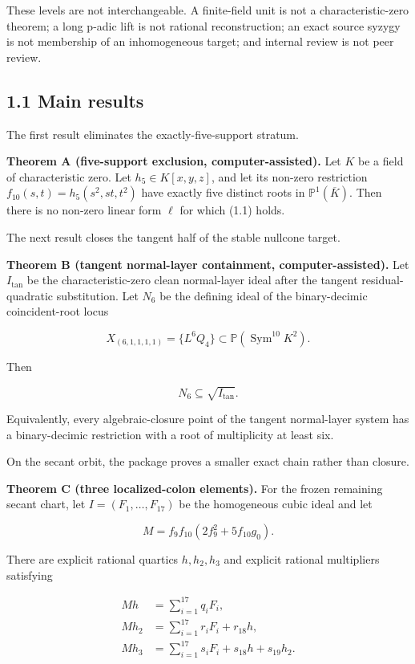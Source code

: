\documentclass[
  11pt,
]{article}
\begin{document}
These levels are not interchangeable. A finite-field unit is not a
characteristic-zero theorem; a long p-adic lift is not rational
reconstruction; an exact source syzygy is not membership of an
inhomogeneous target; and internal review is not peer review.

\subsection{1.1 Main results}\label{main-results}

The first result eliminates the exactly-five-support stratum.

\textbf{Theorem A (five-support exclusion, computer-assisted).} Let
\(K\) be a field of characteristic zero. Let \(h_5\in K[x,y,z]\), and
let its non-zero restriction \(f_{10}(s,t)=h_5(s^2,st,t^2)\) have
exactly five distinct roots in \(\mathbb P^1(\overline K)\). Then there
is no non-zero linear form \(\ell\) for which (1.1) holds.

The next result closes the tangent half of the stable nullcone target.

\textbf{Theorem B (tangent normal-layer containment,
computer-assisted).} Let \(I_{\mathrm{tan}}\) be the characteristic-zero
clean normal-layer ideal after the tangent residual-quadratic
substitution. Let \(N_6\) be the defining ideal of the binary-decimic
coincident-root locus

\[
X_{(6,1,1,1,1)}=\{L^6Q_4\}\subset
\mathbb P(\operatorname{Sym}^{10}K^2).
\]

Then

\[
N_6\subseteq \sqrt{I_{\mathrm{tan}}}.
\tag{1.2}
\]

Equivalently, every algebraic-closure point of the tangent normal-layer
system has a binary-decimic restriction with a root of multiplicity at
least six.

On the secant orbit, the package proves a smaller exact chain rather
than closure.

\textbf{Theorem C (three localized-colon elements).} For the frozen
remaining secant chart, let \(I=(F_1,\ldots,F_{17})\) be the homogeneous
cubic ideal and let

\[
M=f_9f_{10}(2f_9^2+5f_{10}g_0).
\]

There are explicit rational quartics \(h,h_2,h_3\) and explicit rational
multipliers satisfying

\[
\begin{aligned}
Mh   &=\sum_{i=1}^{17}q_iF_i,\\
Mh_2 &=\sum_{i=1}^{17}r_iF_i+r_{18}h,\\
Mh_3 &=\sum_{i=1}^{17}s_iF_i+s_{18}h+s_{19}h_2.
\end{aligned}
\tag{1.3}
\]
\end{document}
